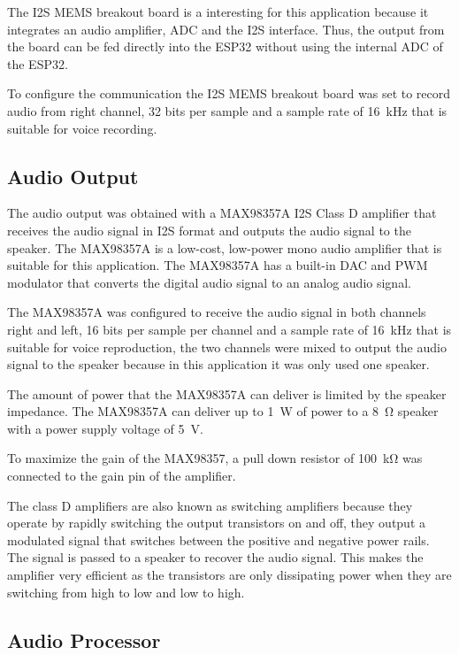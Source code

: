 The I2S MEMS breakout board is a interesting for this application because it integrates an audio amplifier, ADC and the I2S interface. Thus, the output from the board can be fed directly into the ESP32 without using the internal ADC of the ESP32.

To configure the communication the I2S MEMS breakout board was set to record audio from right channel, 32 bits per sample and a sample rate of \SI{16}{\kilo \hertz} that is suitable for voice recording. 

\subsection{Audio Output}

The audio output was obtained with a MAX98357A I2S Class D amplifier that receives the audio signal in I2S format and outputs the audio signal to the speaker. The MAX98357A is a low-cost, low-power mono audio amplifier that is suitable for this application. The MAX98357A has a built-in DAC and PWM modulator that converts the digital audio signal to an analog audio signal. 

The MAX98357A was configured to receive the audio signal in both channels right and left, 16 bits per sample per channel and a sample rate of \SI{16}{\kilo \hertz} that is suitable for voice reproduction, the two channels were mixed to output the audio signal to the speaker because in this application it was only used one speaker.

The amount of power that the MAX98357A can deliver is limited by the speaker impedance. The MAX98357A can deliver up to \SI{1}{\watt} of power to a \SI{8}{\ohm} speaker with a power supply voltage of \SI{5}{\volt}. 

To maximize the gain of the MAX98357, a pull down resistor of \SI{100}{\kilo \ohm} was connected to the gain pin of the amplifier.

The class D amplifiers are also known as switching amplifiers because they operate by rapidly switching the output transistors on and off, they output a modulated signal that switches between the positive and negative power rails. The signal is passed to a speaker to recover the audio signal. This makes the amplifier very efficient as the transistors are only dissipating power when they are switching from high to low and low to high.

\subsection{Audio Processor}

